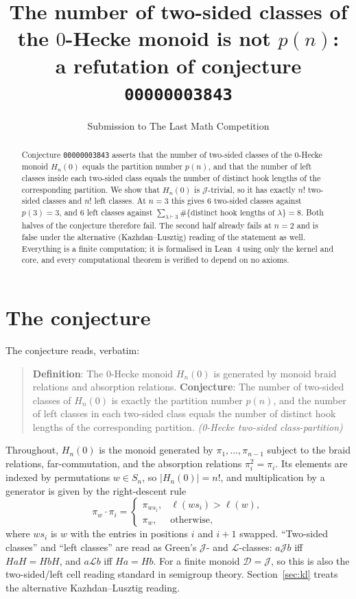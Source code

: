 \documentclass[11pt]{article}
\title{The number of two-sided classes of the $0$-Hecke monoid is not $p(n)$:\\
a refutation of conjecture \texttt{00000003843}}
\author{Submission to The Last Math Competition}
\date{}
\begin{document}
\maketitle

\begin{abstract}
Conjecture \texttt{00000003843} asserts that the number of two-sided classes of
the $0$-Hecke monoid $H_n(0)$ equals the partition number $p(n)$, and that the
number of left classes inside each two-sided class equals the number of distinct
hook lengths of the corresponding partition.  We show that $H_n(0)$ is
$\mathcal{J}$-trivial, so it has exactly $n!$ two-sided classes and $n!$ left
classes.  At $n = 3$ this gives $6$ two-sided classes against $p(3) = 3$, and
$6$ left classes against $\sum_{\lambda \vdash 3}
\#\{\text{distinct hook lengths of }\lambda\} = 8$.  Both halves of the
conjecture therefore fail.  The second half already fails at $n = 2$ and is
false under the alternative (Kazhdan--Lusztig) reading of the statement as well.
Everything is a finite computation; it is formalised in Lean~4 using only the
kernel and core, and every computational theorem is verified to depend on no
axioms.
\end{abstract}

\section{The conjecture}

The conjecture reads, verbatim:

\begin{quote}
\textbf{Definition}: The $0$-Hecke monoid $H_n(0)$ is generated by monoid braid
relations and absorption relations.  \textbf{Conjecture}: The number of two-sided
classes of $H_n(0)$ is exactly the partition number $p(n)$, and the number of
left classes in each two-sided class equals the number of distinct hook lengths
of the corresponding partition. \emph{(0-Hecke two-sided class-partition)}
\end{quote}

Throughout, $H_n(0)$ is the monoid generated by $\pi_1,\dots,\pi_{n-1}$ subject
to the braid relations, far-commutation, and the absorption relations
$\pi_i^2 = \pi_i$.  Its elements are indexed by permutations $w \in S_n$, so
$\lvert H_n(0)\rvert = n!$, and multiplication by a generator is given by the
right-descent rule
\[
  \pi_w \cdot \pi_i =
  \begin{cases}
    \pi_{w s_i}, & \ell(w s_i) > \ell(w),\\
    \pi_w,       & \text{otherwise,}
  \end{cases}
\]
where $w s_i$ is $w$ with the entries in positions $i$ and $i+1$ swapped.
``Two-sided classes'' and ``left classes'' are read as Green's $\mathcal{J}$- and
$\mathcal{L}$-classes: $a \mathrel{\mathcal{J}} b$ iff $HaH = HbH$, and
$a \mathrel{\mathcal{L}} b$ iff $Ha = Hb$.  For a finite monoid
$\mathcal{D} = \mathcal{J}$, so this is also the two-sided/left cell reading
standard in semigroup theory.  Section~\ref{sec:kl} treats the alternative
Kazhdan--Lusztig reading.
\end{document}
